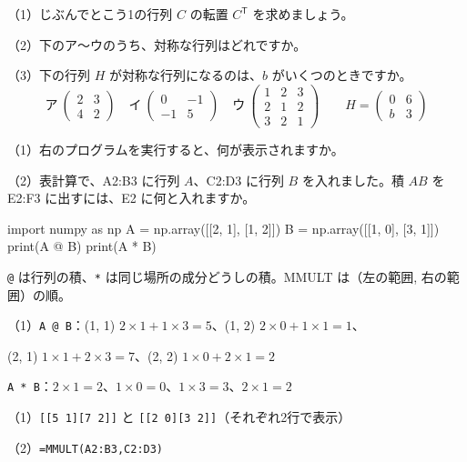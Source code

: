 \begin{jibun}
（1）じぶんでとこう1の行列 $C$ の転置 $C^{\mathsf T}$ を求めましょう。\par
（2）下のア〜ウのうち、対称な行列はどれですか。\par
（3）下の行列 $H$ が対称な行列になるのは、$b$ がいくつのときですか。
\[ \text{ア}\ \begin{pmatrix} 2 & 3\\ 4 & 2 \end{pmatrix}\quad \text{イ}\ \begin{pmatrix} 0 & -1\\ -1 & 5 \end{pmatrix}\quad \text{ウ}\ \begin{pmatrix} 1 & 2 & 3\\ 2 & 1 & 2\\ 3 & 2 & 1 \end{pmatrix}\qquad H=\begin{pmatrix} 0 & 6\\ b & 3 \end{pmatrix} \]
\end{jibun}

\begin{reidai}
\noindent\begin{minipage}[t]{0.48\linewidth}\vspace{0pt}\raggedright
（1）右のプログラムを実行すると、何が表示されますか。\par\vspace{3pt}
（2）表計算で、A2:B3 に行列 $A$、C2:D3 に行列 $B$ を入れました。積 $AB$ を E2:F3 に出すには、E2 に何と入れますか。
\end{minipage}\hfill
\begin{minipage}[t]{0.49\linewidth}\vspace{0pt}
\begin{bkcode}[Python]
import numpy as np
A = np.array([[2, 1],
              [1, 2]])
B = np.array([[1, 0],
              [3, 1]])
print(A @ B)
print(A * B)
\end{bkcode}
\end{minipage}\par
\kangaekata \texttt{@} は行列の積、\texttt{*} は同じ場所の成分どうしの積。MMULT は（左の範囲, 右の範囲）の順。\par
\shiki\kviibs{}\zw{} （1）\texttt{A @ B}：(1, 1) $2\times1+1\times3=5$、(1, 2) $2\times0+1\times1=1$、\par
\kviiba \phantom{（1）}(2, 1) $1\times1+2\times3=7$、(2, 2) $1\times0+2\times1=2$\par
\kviiba \phantom{（1）}\texttt{A * B}：$2\times1=2$、$1\times0=0$、$1\times3=3$、$2\times1=2$\par
\kotae\kviibs{}\zw{} （1）\mbox{\texttt{[[5 1]}\enspace\texttt{[7 2]]}} と \mbox{\texttt{[[2 0]}\enspace\texttt{[3 2]]}}（それぞれ2行で表示）\par
\kviiba （2）\texttt{=MMULT(A2:B3,C2:D3)}
\end{reidai}


